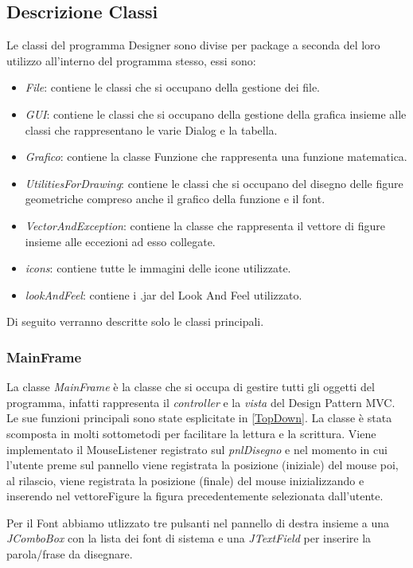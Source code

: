 \documentclass[a4paper,12pt,times,numbered,print,index]{article}
\begin{document}
\subsection{Descrizione Classi}
Le classi del programma Designer sono divise per package a seconda del loro utilizzo all'interno del programma stesso, essi sono:
\begin{itemize}
	\item \textit{File}: contiene le classi che si occupano della gestione dei file.
	\item \textit{GUI}: contiene le classi che si occupano della gestione della grafica insieme alle classi che rappresentano le varie Dialog e la tabella.
	\item \textit{Grafico}: contiene la classe Funzione che rappresenta una funzione matematica.
	\item \textit{UtilitiesForDrawing}: contiene le classi che si occupano del disegno delle figure geometriche compreso anche il grafico della funzione e il font.
	\item \textit{VectorAndException}: contiene la classe che rappresenta il vettore di figure insieme alle eccezioni ad esso collegate.
	\item \textit{icons}: contiene tutte le immagini delle icone utilizzate.
	\item \textit{lookAndFeel}: contiene i .jar del Look And Feel utilizzato.
\end{itemize}
Di seguito verranno descritte solo le classi principali.

\subsubsection{MainFrame} %
La classe \textit{MainFrame} è la classe che si occupa di gestire tutti gli oggetti del programma, infatti rappresenta il \textit{controller} e la \textit{vista} del Design Pattern MVC. Le sue funzioni principali sono state esplicitate in \ref{TopDown}. La classe è stata scomposta in molti sottometodi per facilitare la lettura e la scrittura. Viene implementato il MouseListener registrato sul \textit{pnlDisegno} e nel momento in cui l'utente preme sul pannello viene registrata la posizione (iniziale) del mouse poi, al rilascio, viene registrata la posizione (finale) del mouse inizializzando e inserendo nel vettoreFigure la figura precedentemente selezionata dall'utente.

Per il Font abbiamo utlizzato tre pulsanti nel pannello di destra insieme a una \textit{JComboBox} con la lista dei font di sistema e una \textit{JTextField} per inserire la parola/frase da disegnare.
\end{document}
